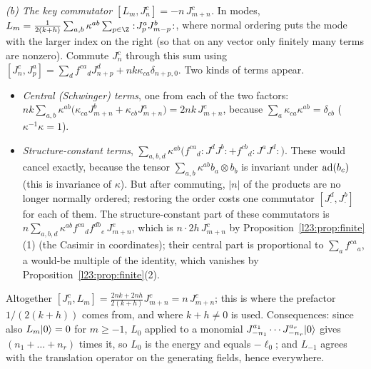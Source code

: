 \emph{(b) The key commutator $[L_m,J^c_n]=-n\,J^c_{m+n}$.} In modes,
$L_m=\frac{1}{2(k+h)}\sum_{a,b}\kappa^{ab}\sum_{p\in\Z}:\!J^a_pJ^b_{m-p}\!:$, where normal ordering puts the mode with the larger
index on the right (so that on any vector only finitely many terms are nonzero). Commute $J^c_n$ through this sum using
$[J^c_n,J^a_p]=\sum_df^{ca}{}_dJ^d_{n+p}+nk\kappa_{ca}\delta_{n+p,0}$. Two kinds of terms appear.
\begin{itemize}
\item \emph{Central (Schwinger) terms}, one from each of the two factors:
  $nk\sum_{a,b}\kappa^{ab}\big(\kappa_{ca}J^b_{m+n}+\kappa_{cb}J^a_{m+n}\big)=2nk\,J^c_{m+n}$, because
  $\sum_a\kappa_{ca}\kappa^{ab}=\delta_{cb}$ ($\kappa^{-1}\kappa=1$).
\item \emph{Structure-constant terms}, $\sum_{a,b,d}\kappa^{ab}\big(f^{ca}{}_d:\!J^dJ^b\!:+f^{cb}{}_d:\!J^aJ^d\!:\big)$. These would cancel
  exactly, because the tensor $\sum_{a,b}\kappa^{ab}b_a\otimes b_b$ is invariant under $\operatorname{ad}(b_c)$ (this is invariance of
  $\kappa$). But after commuting, $|n|$ of the products are no longer normally ordered; restoring the order costs one commutator
  $[J^d_\cdot,J^b_\cdot]$ for each of them. The structure-constant part of these commutators is
  $n\sum_{a,b,d}\kappa^{ab}f^{ca}{}_df^{db}{}_e\,J^e_{m+n}$, which is $n\cdot2h\,J^c_{m+n}$ by Proposition~\ref{l23:prop:finite}(1)
  (the Casimir in coordinates); their central part is proportional to $\sum_af^{ca}{}_a$, a would-be multiple of the identity, which
  vanishes by Proposition~\ref{l23:prop:finite}(2).
\end{itemize}
Altogether $[J^c_n,L_m]=\frac{2nk+2nh}{2(k+h)}J^c_{m+n}=n\,J^c_{m+n}$; this is where the prefactor $1/(2(k+h))$ comes from, and
where $k+h\ne0$ is used. Consequences: since also $L_m|0\rangle=0$ for $m\ge-1$, $L_0$ applied to a monomial
$J^{a_1}_{-n_1}\cdots J^{a_r}_{-n_r}|0\rangle$ gives $(n_1+\dots+n_r)$ times it, so $L_0$ is the energy and equals $-\ell_0$; and
$L_{-1}$ agrees with the translation operator on the generating fields, hence everywhere.

